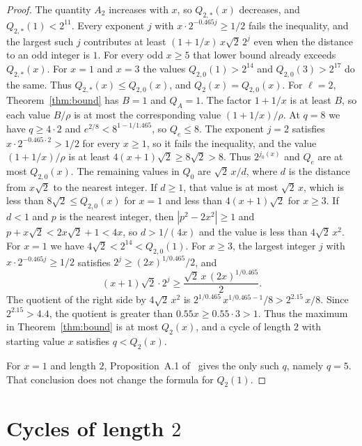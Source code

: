 \documentclass[11pt]{article}
\begin{document}
\begin{proof}
The quantity $A_2$ increases with $x$, so $Q_{2,*}(x)$ decreases, and $Q_{2,*}(1) < 2^{11}$.
Every exponent $j$ with $x \cdot 2^{-0.465 j} \ge 1/2$ fails the inequality, and the largest such $j$ contributes at least $(1+1/x)\, x \sqrt{2}\, 2^{j}$ even when the distance to an odd integer is $1$.
For every odd $x \ge 5$ that lower bound already exceeds $Q_{2,*}(x)$.
For $x = 1$ and $x = 3$ the values $Q_{2,0}(1) > 2^{14}$ and $Q_{2,0}(3) > 2^{17}$ do the same.
Thus $Q_{2,*}(x) \le Q_{2,0}(x)$, and $Q_2(x) = Q_{2,0}(x)$.
For $\ell = 2$, Theorem~\ref{thm:bound} has $B = 1$ and $Q_A = 1$.
The factor $1+1/x$ is at least $B$, so each value $B/\rho$ is at most the corresponding value $(1+1/x)/\rho$.
At $q = 8$ we have $q \ge 4\cdot 2$ and $e^{2/8} < 8^{1 - 1/1.465}$, so $Q_e \le 8$.
The exponent $j = 2$ satisfies $x \cdot 2^{-0.465 \cdot 2} > 1/2$ for every $x \ge 1$, so it fails the inequality, and the value $(1+1/x)/\rho$ is at least $4(x+1)\sqrt{2} \ge 8\sqrt{2} > 8$.
Thus $2^{j_0(x)}$ and $Q_e$ are at most $Q_{2,0}(x)$.
The remaining values in $Q_0$ are $\sqrt{2}\, x / d$, where $d$ is the distance from $x\sqrt{2}$ to the nearest integer.
If $d \ge 1$, that value is at most $\sqrt{2}\, x$, which is less than $8\sqrt{2} \le Q_{2,0}(x)$ for $x = 1$ and less than $4(x+1)\sqrt{2}$ for $x \ge 3$.
If $d < 1$ and $p$ is the nearest integer, then $|p^2 - 2x^2| \ge 1$ and $p + x\sqrt{2} < 2x\sqrt{2} + 1 < 4x$, so $d > 1/(4x)$ and the value is less than $4\sqrt{2}\, x^2$.
For $x = 1$ we have $4\sqrt{2} < 2^{14} < Q_{2,0}(1)$.
For $x \ge 3$, the largest integer $j$ with $x \cdot 2^{-0.465 j} \ge 1/2$ satisfies $2^j \ge (2x)^{1/0.465}/2$, and
\[
(x+1)\sqrt{2}\cdot 2^{j} \ge \frac{\sqrt{2}\, x\, (2x)^{1/0.465}}{2}.
\]
The quotient of the right side by $4\sqrt{2}\, x^2$ is $2^{1/0.465}\, x^{1/0.465 - 1}/8 > 2^{2.15}\, x / 8$.
Since $2^{2.15} > 4.4$, the quotient is greater than $0.55x \ge 0.55 \cdot 3 > 1$.
Thus the maximum in Theorem~\ref{thm:bound} is at most $Q_2(x)$, and a cycle of length $2$ with starting value $x$ satisfies $q < Q_2(x)$.

For $x = 1$ and length $2$, Proposition~A.1 of~\cite{hackman-i} gives the only such $q$, namely $q = 5$.
That conclusion does not change the formula for $Q_2(1)$.
\end{proof}

\section{Cycles of length $2$}
\label{sec:length-2}
\end{document}
